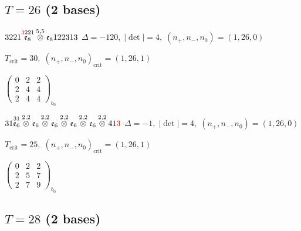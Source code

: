 \documentclass[10pt]{article}
\begin{document}
\subsection*{$T = 26$ \quad (2 bases)}
\smallskip

$3221\overset{\textcolor{red}{3}221}{\mathfrak{e}_8}\overset{5,5}{\otimes}\mathfrak{e}_8122313$ \quad $\Delta=-120,\; |\det|=4,\; (n_+,n_-,n_0)=(1,26,0)$

\hspace{1em}$T_{\text{crit}}=30,\; (n_+,n_-,n_0)_{\text{crit}}=(1,26,1)$

\hspace{2em}$\left(\begin{smallmatrix}0 & 2 & 2 \\ 2 & 4 & 4 \\ 2 & 4 & 4\end{smallmatrix}\right)_{\!b_0}$

\smallskip

$31\overset{31}{\mathfrak{e}_6}\overset{2,2}{\otimes}\mathfrak{e}_6\overset{2,2}{\otimes}\mathfrak{e}_6\overset{2,2}{\otimes}\mathfrak{e}_6\overset{2,2}{\otimes}\mathfrak{e}_6\overset{2,2}{\otimes}41\textcolor{red}{3}$ \quad $\Delta=-1,\; |\det|=4,\; (n_+,n_-,n_0)=(1,26,0)$

\hspace{1em}$T_{\text{crit}}=25,\; (n_+,n_-,n_0)_{\text{crit}}=(1,26,1)$

\hspace{2em}$\left(\begin{smallmatrix}0 & 2 & 2 \\ 2 & 5 & 7 \\ 2 & 7 & 9\end{smallmatrix}\right)_{\!b_0}$


\subsection*{$T = 28$ \quad (2 bases)}
\smallskip
\end{document}
